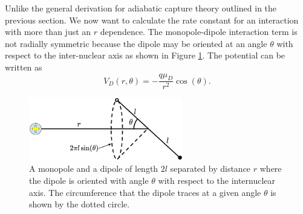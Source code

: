 Unlike the general derivation for adiabatic capture theory outlined in the previous section. We now want to calculate the rate constant for an interaction with more than just an $r$ dependence. The monopole-dipole interaction term is not radially symmetric because the dipole may be oriented at an angle $\theta$ with respect to the inter-nuclear axis as shown in Figure \ref{fig: dipole angle}. The potential can be written as
\begin{equation}
	V_D(r, \theta) = -\frac{q\mu_D}{r^2} \cos(\theta).
	\label{eq: V_D}
\end{equation}

\begin{figure}[H]
	\centering
	\includegraphics[width=0.6\textwidth]{images/dipole_angle.png}
	\caption{A monopole and a dipole of length $2l$ separated by distance $r$ where the dipole is oriented with angle $\theta$ with respect to the internuclear axis. The circumference that the dipole traces at a given angle $\theta$ is shown by the dotted circle.}
	\label{fig: dipole angle}
\end{figure}

